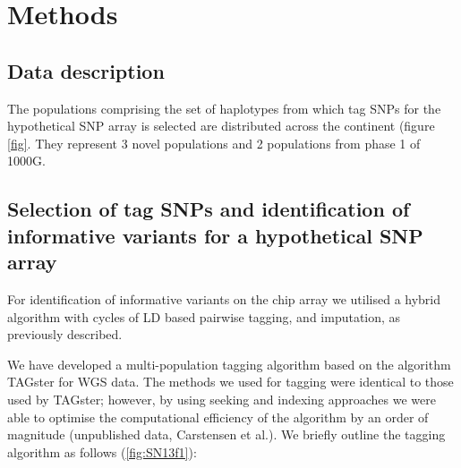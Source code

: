 \section{Methods}
\label{sec:methods_chip}

\subsection{Data description}
The populations comprising the set of haplotypes from which tag \glspl{SNP} for the hypothetical \gls{SNP} array is selected are distributed across the continent (figure \ref{fig}. They represent 3 novel populations and 2 populations from phase 1 of \gls{1000G}.


\subsection{Selection of tag SNPs and identification of informative variants for a hypothetical SNP array}


For identification of informative variants on the chip array we utilised a hybrid algorithm with cycles of \gls{LD} based pairwise tagging, and imputation, as previously described.\cite{Hoffmann2011422}

We have developed a multi-population tagging algorithm based on the algorithm TAGster for \gls{WGS} data.\cite{Xu2007} The methods we used for tagging were identical to those used by TAGster; however, by using seeking and indexing approaches we were able to optimise the computational efficiency of the algorithm by an order of magnitude (unpublished data, Carstensen et al.). We briefly outline the tagging algorithm as follows (\ref{fig:SN13f1}):

